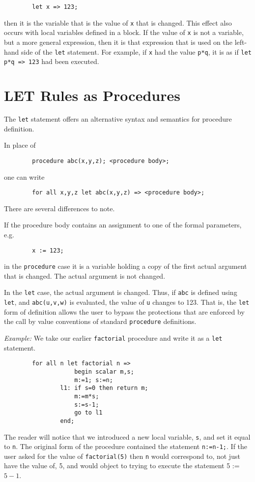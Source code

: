 \begin{verbatim}
        let x => 123;
\end{verbatim}
then it is the variable that is the value of \texttt{x} that is changed.
This effect also occurs with local variables defined in a block.  If the
value of \texttt{x} is not a variable, but a more general expression, then it
is that expression that is used on the left-hand side of the \texttt{let}
statement.  For example, if \texttt{x} had the value \texttt{p*q}, it is as if
\texttt{let p*q => 123} had been executed.

\section{LET Rules as Procedures}

The \texttt{let} statement offers an alternative syntax and
semantics for procedure definition.

In place of
\begin{verbatim}
        procedure abc(x,y,z); <procedure body>;
\end{verbatim}
one can write
\begin{verbatim}
        for all x,y,z let abc(x,y,z) => <procedure body>;
\end{verbatim}
There are several differences to note.

If the procedure body contains an assignment to one of the formal
parameters, e.g.
\begin{verbatim}
        x := 123;
\end{verbatim}
in the \texttt{procedure} case it is a variable holding a copy of the first
actual argument that is changed.  The actual argument is not changed.

In the \texttt{let} case, the actual argument is changed.  Thus, if \texttt{abc}
is defined using \texttt{let}, and \texttt{abc(u,v,w)} is evaluated, the value
of \texttt{u} changes to 123.  That is, the \texttt{let} form of definition
allows the user to bypass the protections that are enforced by the call
by value conventions of standard \texttt{procedure} definitions.

\textit{Example:}  We take our earlier \texttt{factorial}
procedure and write it as a \texttt{let} statement.
\begin{verbatim}
        for all n let factorial n =>
                    begin scalar m,s;
                    m:=1; s:=n;
                l1: if s=0 then return m;
                    m:=m*s;
                    s:=s-1;
                    go to l1
                end;
\end{verbatim}
The reader will notice that we introduced a new local variable, \texttt{s},
and set it equal to \texttt{n}.  The original form of the procedure contained
the statement \texttt{n:=n-1;}.  If the user asked for the value of
\texttt{factorial(5)} then \texttt{n} would correspond to, not just have the value
of, 5, and {\REDUCE} would object to trying to execute the statement
5 := $5-1$.

